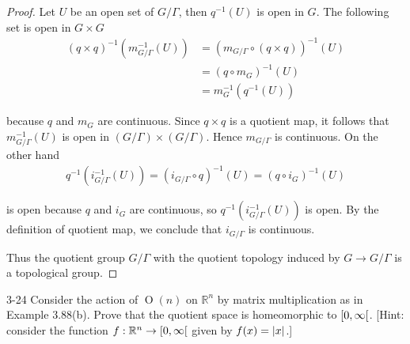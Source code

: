 \begin{proof}
	Let $U$ be an open set of $G/\Gamma$, then $q^{-1}(U)$ is open in $G$. The following set is open in $G\times G$
	\begin{align*}
		{(q \times q)}^{-1}(m_{G/\Gamma}^{-1}(U)) & = {(m_{G/\Gamma} \circ (q\times q))}^{-1}(U) \\
		                                          & = {(q\circ m_{G})}^{-1}(U)                   \\
		                                          & = m_{G}^{-1}(q^{-1}(U))
	\end{align*}

	because $q$ and $m_{G}$ are continuous. Since $q\times q$ is a quotient map, it follows that $m_{G/\Gamma}^{-1}(U)$ is open in $(G/\Gamma)\times (G/\Gamma)$. Hence $m_{G/\Gamma}$ is continuous. On the other hand
	\begin{align*}
		q^{-1}(i_{G/\Gamma}^{-1}(U)) = {(i_{G/\Gamma}\circ q)}^{-1}(U) = {(q\circ i_{G})}^{-1}(U)
	\end{align*}

	is open because $q$ and $i_{G}$ are continuous, so $q^{-1}(i_{G/\Gamma}^{-1}(U))$ is open. By the definition of quotient map, we conclude that $i_{G/\Gamma}$ is continuous.

	Thus the quotient group $G/\Gamma$ with the quotient topology induced by $G\to G/\Gamma$ is a topological group.
\end{proof}

\begin{problem}{3-24}
Consider the action of $\operatorname{O}(n)$ on $\mathbb{R}^{n}$ by matrix multiplication as in Example 3.88(b). Prove that the quotient space is homeomorphic to $\left[{0, \infty}\right[$. [Hint: consider the function $f: \mathbb{R}^{n} \to \left[{0, \infty}\right[$ given by $f(x) = \left\vert{x}\right\vert$.]
\end{problem}

